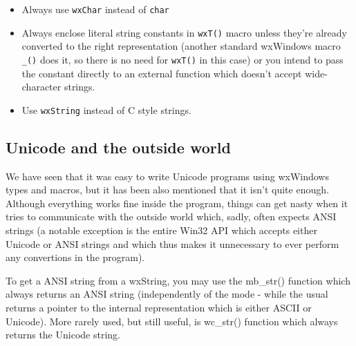 \begin{itemize}
\item Always use {\tt wxChar} instead of {\tt char}
\item Always enclose literal string constants in {\tt wxT()} macro unless
they're already converted to the right representation (another standard
wxWindows macro {\tt \_()} does it, so there is no need for {\tt wxT()} in this
case) or you intend to pass the constant directly to an external function
which doesn't accept wide-character strings.
\item Use {\tt wxString} instead of C style strings.
\end{itemize}

\subsection{Unicode and the outside world}

We have seen that it was easy to write Unicode programs using wxWindows types
and macros, but it has been also mentioned that it isn't quite enough.
Although everything works fine inside the program, things can get nasty when
it tries to communicate with the outside world which, sadly, often expects
ANSI strings (a notable exception is the entire Win32 API which accepts either
Unicode or ANSI strings and which thus makes it unnecessary to ever perform
any convertions in the program).

To get a ANSI string from a wxString, you may use the 
mb\_str() function which always returns an ANSI
string (independently of the mode - while the usual 
 returns a pointer to the internal
representation which is either ASCII or Unicode). More rarely used, but still
useful, is wc\_str() function which always returns
the Unicode string.


